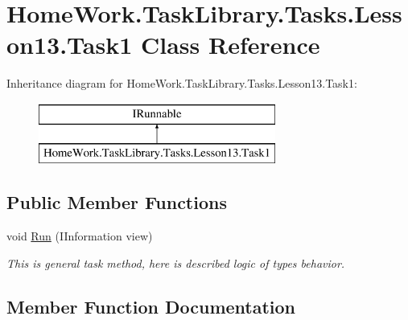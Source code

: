 \hypertarget{class_home_work_1_1_task_library_1_1_tasks_1_1_lesson13_1_1_task1}{}\section{Home\+Work.\+Task\+Library.\+Tasks.\+Lesson13.\+Task1 Class Reference}
\label{class_home_work_1_1_task_library_1_1_tasks_1_1_lesson13_1_1_task1}
Inheritance diagram for Home\+Work.\+Task\+Library.\+Tasks.\+Lesson13.\+Task1\+:\begin{figure}[H]
\begin{center}
\leavevmode
\includegraphics[height=2.000000cm]{class_home_work_1_1_task_library_1_1_tasks_1_1_lesson13_1_1_task1}
\end{center}
\end{figure}
\subsection*{Public Member Functions}
\begin{DoxyCompactItemize}
\item 
void \mbox{\hyperlink{class_home_work_1_1_task_library_1_1_tasks_1_1_lesson13_1_1_task1_a573e483989070bbbec991238d73957c0}{Run}} (I\+Information view)
\begin{DoxyCompactList}\small\item\em This is general task method, here is described logic of types behavior. \end{DoxyCompactList}\end{DoxyCompactItemize}


\subsection{Member Function Documentation}
\mbox{\label{class_home_work_1_1_task_library_1_1_tasks_1_1_lesson13_1_1_task1_a573e483989070bbbec991238d73957c0}} 
